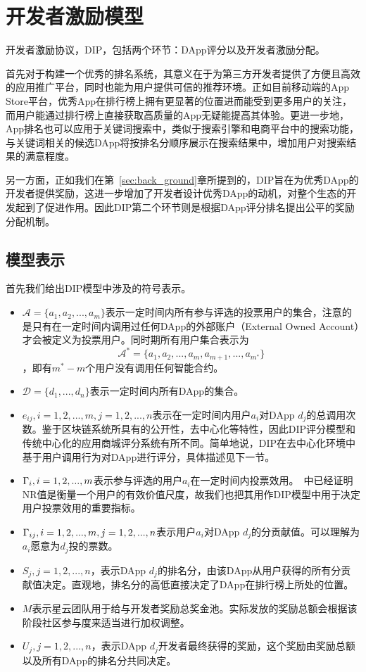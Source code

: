 \section{开发者激励模型}
开发者激励协议，DIP，包括两个环节：DApp评分以及开发者激励分配。

首先对于构建一个优秀的排名系统，其意义在于为第三方开发者提供了方便且高效的应用推广平台，同时也能为用户提供可信的推荐环境。正如目前移动端的App Store平台，优秀App在排行榜上拥有更显著的位置进而能受到更多用户的关注，而用户能通过排行榜上直接获取高质量的App无疑能提高其体验。更进一步地，App排名也可以应用于关键词搜索中，类似于搜索引擎和电商平台中的搜索功能，与关键词相关的候选DApp将按排名分顺序展示在搜索结果中，增加用户对搜索结果的满意程度。

另一方面，正如我们在第~\ref{sec:back_ground}章所提到的，DIP旨在为优秀DApp的开发者提供奖励，这进一步增加了开发者设计优秀DApp的动机，对整个生态的开发起到了促进作用。因此DIP第二个环节则是根据DApp评分排名提出公平的奖励分配机制。

\subsection{模型表示}
\label{subsection:parameters}
首先我们给出DIP模型中涉及的符号表示。
\begin{itemize}
	\item $\mathcal{A}=\{a_1,a_2,...,a_m\}$表示一定时间内所有参与评选的投票用户的集合，注意的是只有在一定时间内调用过任何DApp的外部账户（External Owned Account）才会被定义为投票用户。同时期所有用户集合表示为$$\mathcal{A}^*=\{a_1,a_2,...,a_m,a_{m+1},...,a_{m^*}\}$$，即有$m^*-m$个用户没有调用任何智能合约。
	\item $\mathcal{D}=\{d_1,...,d_n\}$表示一定时间内所有DApp的集合。
	\item $e_{ij},i=1,2,...,m, j=1,2,...,n$表示在一定时间内用户$a_i$对DApp $d_j$的总调用次数。鉴于区块链系统所具有的公开性，去中心化等特性，因此DIP评分模型和传统中心化的应用商城评分系统有所不同。简单地说，DIP在去中心化环境中基于用户调用行为对DApp进行评分，具体描述见下一节。
	\item $\Gamma_i, i=1,2,...,m$表示参与评选的用户$a_i$在一定时间内投票效用。~\cite{Nebulasyellowpaper}中已经证明NR值是衡量一个用户的有效价值尺度，故我们也把其用作DIP模型中用于决定用户投票效用的重要指标。
	\item $\Gamma_{ij}, i=1,2,...,m,j=1,2,...,n$表示用户$a_i$对DApp $d_j$的分贡献值。可以理解为$a_i$愿意为$d_j$投的票数。%
	\item $S_j, j=1,2,...,n$，表示DApp $d_j$的排名分，由该DApp从用户获得的所有分贡献值决定。直观地，排名分的高低直接决定了DApp在排行榜上所处的位置。%
	\item $M$表示星云团队用于给与开发者奖励总奖金池。实际发放的奖励总额会根据该阶段社区参与度来适当进行加权调整。
	\item $U_j, j=1,2,...,n$，表示DApp $d_j$开发者最终获得的奖励，这个奖励由奖励总额以及所有DApp的排名分共同决定。%
\end{itemize}

